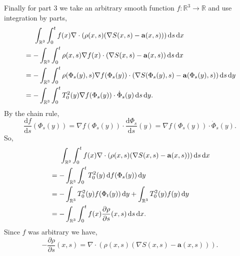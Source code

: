 \documentclass[a4paper,12pt,draft]{report}
\begin{document}
{Finally for part 3 we take an arbitrary smooth function $f: \mathbb{R}^3 \to \mathbb{R}$ and use integration by parts,
\begin{align}
& \hspace{0.5cm} \int_{\mathbb{R}^3}\int_0^tf(x)\nabla\cdot(\rho(x, s)(\nabla S(x, s) - \mathbf{a}(x, s)))\,\mathrm{d}s\,\mathrm{d}x\nonumber\\
& = - \int_{\mathbb{R}^3}\int_0^t\rho(x, s)\nabla f(x)\cdot(\nabla S(x, s) - \mathbf{a}(x, s))\,\mathrm{d}s\,\mathrm{d}x\nonumber\\
& = - \int_{\mathbb{R}^3}\int_0^t\rho(\Phi_s(y), s)\nabla f(\Phi_s(y))\cdot(\nabla S(\Phi_s(y), s) - \mathbf{a}(\Phi_s(y), s))\,\mathrm{d}s\,\mathrm{d}y\nonumber\\
& = - \int_{\mathbb{R}^3}\int_0^tT_0^2(y)\nabla f(\Phi_s(y))\cdot\dot{\Phi}_s(y)\,\mathrm{d}s\,\mathrm{d}y.\nonumber
\end{align}
By the chain rule,
$$
\frac{\mathrm{d}f}{\mathrm{d}s}(\Phi_s(y)) = \nabla f(\Phi_s(y))\cdot\frac{\mathrm{d}\Phi_s}{\mathrm{d}s}(y) = \nabla f(\Phi_s(y))\cdot\dot{\Phi}_s(y).
$$
So,
\begin{align}
& \hspace{0.5cm} \int_{\mathbb{R}^3}\int_0^tf(x)\nabla\cdot(\rho(x, s)(\nabla S(x, s) - \mathbf{a}(x, s)))\,\mathrm{d}s\,\mathrm{d}x\nonumber\\
& = - \int_{\mathbb{R}^3}\int_0^tT_0^2(y)\,\mathrm{d}f(\Phi_s(y))\,\mathrm{d}y\nonumber\\
& = - \int_{\mathbb{R}^3}T_0^2(y)f(\Phi_t(y))\,\mathrm{d}y + \int_{\mathbb{R}^3}T_0^2(y)f(y)\,\mathrm{d}y\nonumber\\
& = - \int_{\mathbb{R}^3}\int_0^tf(x)\frac{\partial\rho}{\partial s}(x, s)\,\mathrm{d}s\,\mathrm{d}x.\nonumber
\end{align}
Since $f$ was arbitrary we have,
$$
-\frac{\partial\rho}{\partial s}(x, s) = \nabla\cdot(\rho(x, s)(\nabla S(x, s) - \mathbf{a}(x, s))).
$$

\qedhere
}
\end{document}
